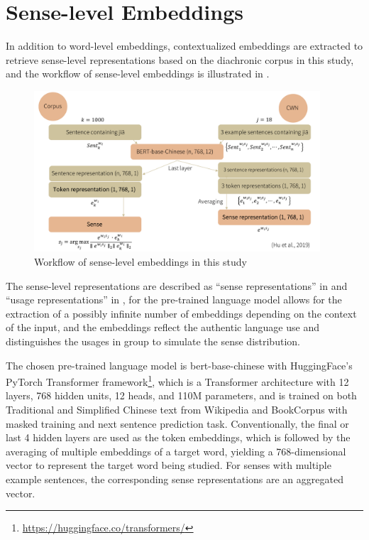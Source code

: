\section{Sense-level Embeddings}
In addition to word-level embeddings, contextualized embeddings are extracted to retrieve sense-level representations based on the diachronic corpus in this study, and the workflow of sense-level embeddings is illustrated in .

\begin{figure}[H]
  \centering
  \includegraphics[height=0.4\textheight,width=0.95\textwidth,keepaspectratio]{figures_new/from_slides/workflow_sense_level.pdf}
  \caption{Workflow of sense-level embeddings in this study}
  \label{fig:workflow_sense_level}
\end{figure}

The sense-level representations are described as ``sense representations'' in \textcite{hu2019diachronic} and ``usage representations'' in \textcite{giulianelli2019lexical}, for the pre-trained language model allows for the extraction of a possibly infinite number of embeddings depending on the context of the input, and the embeddings reflect the authentic language use and distinguishes the usages in group to simulate the sense distribution.

The chosen pre-trained language model is bert-base-chinese \parencite{devlin2018bert} with HuggingFace's PyTorch Transformer framework\footnote{\url{https://huggingface.co/transformers/}}, which is a Transformer architecture with 12 layers, 768 hidden units, 12 heads, and 110M parameters, and is trained on both Traditional and Simplified Chinese text from Wikipedia and BookCorpus with masked training and next sentence prediction task. Conventionally, the final or last 4 hidden layers are used as the token embeddings, which is followed by the averaging of multiple embeddings of a target word, yielding a 768-dimensional vector to represent the target word being studied. For senses with multiple example sentences, the corresponding sense representations are an aggregated vector.

